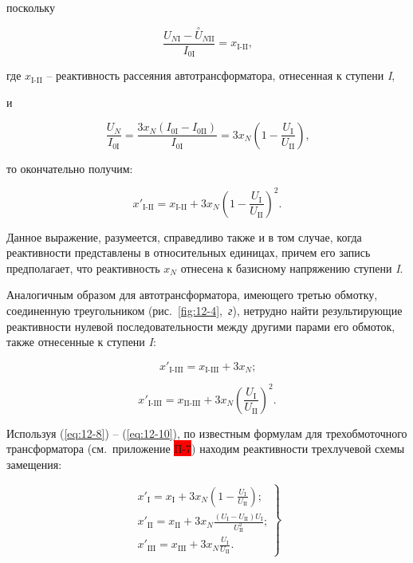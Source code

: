 поскольку

\begin{equation*}
	\frac{ U_{N\text{I}} - \overset{\circ }{U}_{N\text{II}} }{ I_{0\text{I}} } = x_{\text{I-II}} \text{,}
\end{equation*}

где $ x_{\text{I-II}} $ -- реактивность рассеяния автотрансформатора, отнесенная к ступени \textit{I},

и

\begin{equation*}
	\frac{ U_{N} }{ I_{0\text{I}} } = \frac{ 3x_N ( I_{0\text{I}} - I_{0\text{II}} ) }{ I_{0\text{I}} } = 3x_N \left ( 1- \frac{U_{\text{I}}}{U_{\text{II}}} \right ) \text{,}
\end{equation*}

то окончательно получим:

\begin{equation}
	x'_{\text{I-II}} = x_{\text{I-II}} + 3x_N \left ( 1- \frac{U_{\text{I}}}{U_{\text{II}}} \right )^2 \text{.}
	\label{eq:12-8}
\end{equation}

Данное выражение, разумеется, справедливо также и в том случае, когда реактивности представлены в относительных единицах, причем его запись предполагает, что реактивность $ x_N $ отнесена к базисному напряжению ступени \textit{I}.

Аналогичным образом для автотрансформатора, имеющего третью обмотку, соединенную треугольником (рис.~\ref{fig:12-4},~\textit{г}), нетрудно найти результирующие реактивности нулевой последовательности между другими парами его обмоток, также отнесенные к ступени \textit{I}:

\begin{equation}
	x'_{\text{I-III}} = x_{\text{I-III}} + 3x_N \text{;}
	\label{eq:12-9}
\end{equation}

\begin{equation}
	x'_{\text{I-III}} = x_{\text{II-III}} + 3x_N \left (\frac{U_{\text{I}}}{U_{\text{II}}} \right )^2 \text{.}
	\label{eq:12-10}
\end{equation}

Используя (\ref{eq:12-8}) -- (\ref{eq:12-10}), по известным формулам для трехобмоточного трансформатора (см.~приложение \colorbox{red}{П-7}) находим реактивности трехлучевой схемы замещения:

\begin{equation}
	\left.\begin{matrix}
	x'_{\text{I}} = x_{\text{I}} + 3x_N \left ( 1- \frac{U_{\text{I}}}{U_{\text{II}}} \right ) \text{;} \\[1em]
	x'_{\text{II}} = x_{\text{II}} + 3x_N \frac{(U_{\text{I}} - U_{\text{II}})U_{\text{I}}}{U_{\text{II}}^2} \text{;} \\[1em]
	x'_{\text{III}} = x_{\text{III}} + 3x_N \frac{U_{\text{I}}}{U_{\text{II}}} \text{.}
	\end{matrix}\right\}
	\label{eq:12-11}
\end{equation}

